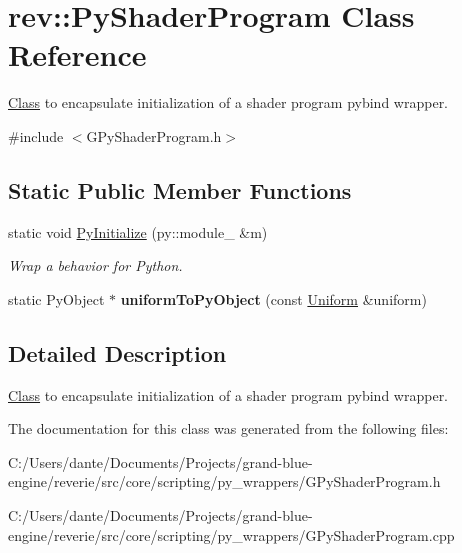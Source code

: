 \hypertarget{classrev_1_1_py_shader_program}{}\section{rev\+::Py\+Shader\+Program Class Reference}
\label{classrev_1_1_py_shader_program}


\mbox{\hyperlink{struct_class}{Class}} to encapsulate initialization of a shader program pybind wrapper.  




{\ttfamily \#include $<$G\+Py\+Shader\+Program.\+h$>$}

\subsection*{Static Public Member Functions}
\begin{DoxyCompactItemize}
\item 
\mbox{\label{classrev_1_1_py_shader_program_a9554384ea96a241b6e9d7dacbd0c172f}} 
static void \mbox{\hyperlink{classrev_1_1_py_shader_program_a9554384ea96a241b6e9d7dacbd0c172f}{Py\+Initialize}} (py\+::module\+\_\+ \&m)
\begin{DoxyCompactList}\small\item\em Wrap a behavior for Python. \end{DoxyCompactList}\item 
\mbox{\label{classrev_1_1_py_shader_program_ae65861eb3e4fd63fda12392199856646}} 
static Py\+Object $\ast$ {\bfseries uniform\+To\+Py\+Object} (const \mbox{\hyperlink{structrev_1_1_uniform}{Uniform}} \&uniform)
\end{DoxyCompactItemize}


\subsection{Detailed Description}
\mbox{\hyperlink{struct_class}{Class}} to encapsulate initialization of a shader program pybind wrapper. 

The documentation for this class was generated from the following files\+:\begin{DoxyCompactItemize}
\item 
C\+:/\+Users/dante/\+Documents/\+Projects/grand-\/blue-\/engine/reverie/src/core/scripting/py\+\_\+wrappers/G\+Py\+Shader\+Program.\+h\item 
C\+:/\+Users/dante/\+Documents/\+Projects/grand-\/blue-\/engine/reverie/src/core/scripting/py\+\_\+wrappers/G\+Py\+Shader\+Program.\+cpp\end{DoxyCompactItemize}
